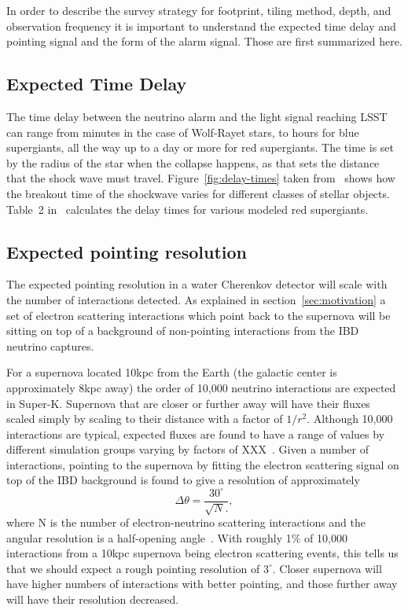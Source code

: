\documentclass[12pt, letterpaper]{article}
\newcommand{\superk}  {Super\nobreakdash-K\xspace}
\begin{document}
In order to describe the survey strategy for footprint, tiling method,
depth, and observation frequency it is important to understand the
expected time delay and pointing signal and the form of the alarm
signal.  Those are first summarized here.

\subsection{Expected Time Delay}

The time delay between the neutrino alarm and the light signal
reaching LSST can range from minutes in the case of Wolf-Rayet stars,
to hours for blue supergiants, all the way up to a day or more for red
supergiants.  The time is set by the radius of the star when the
collapse happens, as that sets the distance that the shock wave must
travel.  Figure~\ref{fig:delay-times} taken
from~\cite{2013ApJ...778...81K} shows how the breakout time of the
shockwave varies for different classes of stellar objects. Table~2
in~\cite{2015ApJ...814...63M}  calculates the delay times for various
modeled red supergiants.

\subsection{Expected pointing resolution}

The expected pointing resolution in a water Cherenkov detector will
scale with the number of interactions detected.  As explained in
section~\ref{sec:motivation} a set of electron scattering interactions which
point back to the supernova will be sitting on top of a background of
non-pointing interactions from the IBD neutrino captures.

For a supernova located 10kpc from the Earth (the galactic center is
approximately 8kpc away) the order of 10,000 neutrino interactions are
expected in \superk.  Supernova that are closer or further away will
have their fluxes scaled simply by scaling to their distance with a
factor of $1/r^2$.  Although 10,000 interactions are typical, expected
fluxes are found to have a range of values by different simulation
groups varying by factors of XXX~\cite{model_references}.  Given a
number of interactions, pointing to the supernova by fitting the
electron scattering signal on top of the IBD background is found to
give a resolution of approximately
%
$$ \Delta \theta = \frac{30^\circ}{\sqrt{N}.}, $$
%
where N is the number of electron-neutrino scattering interactions and
the angular resolution is a half-opening
angle~\cite{2012ARNPS..62...81S}.  With roughly 1\% of 10,000
interactions from a 10kpc supernova being electron scattering events,
this tells us that we should expect a rough pointing resolution of
$3^\circ$.  Closer supernova will have higher numbers of interactions
with better pointing, and those further away will have their
resolution decreased.
\end{document}
